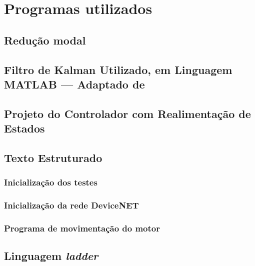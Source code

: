


\chapter{Programas utilizados}

\section{Redução modal}
\label {reducaoModalPrograma}


\section{Filtro de Kalman Utilizado, em Linguagem MATLAB --- Adaptado de \cite{GoddardKalmanCode}}
\label {KalmanCode}


\section{Projeto do Controlador com Realimentação de Estados}
\label{projetoControlador}


\section{Texto Estruturado}
\label {stsection}

\subsection{Inicialização dos testes}
\label {stMFinit}


\subsection{Inicialização da rede DeviceNET}
\label{dninitST}


\subsection{Programa de movimentação do motor}
\label{mfprogST}


\newpage

\section{Linguagem \textit{ladder}}
